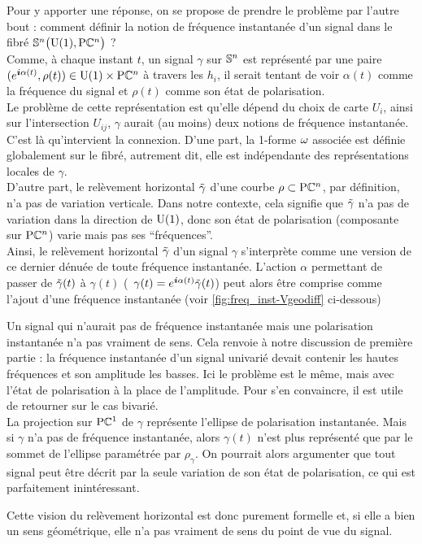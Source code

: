 Pour y apporter une réponse, on se propose de prendre le problème par l'autre bout : comment définir la notion de fréquence instantanée d'un signal dans le fibré $\VFP$ ?
\\

Comme, à chaque instant $t$, un signal $\gamma$ sur $\S{n}$ est représenté par une paire $(e^{\i \alpha(t)}, \rho(t))\in\U{1}\times\PC{n}$ à travers les $h_i$,  il serait tentant de voir $\alpha(t)$ comme la fréquence du signal et $\rho(t)$ comme son état de polarisation.
\\
Le problème de cette représentation est qu'elle dépend du choix de carte $U_i$, ainsi sur l'intersection $U_{ij}$, $\gamma$ aurait (au moins) deux notions de fréquence instantanée.
\\

C'est là qu'intervient la connexion. D'une part, la 1-forme $\conn$ associée est définie globalement sur le fibré, autrement dit, elle est indépendante des représentations locales de $\gamma$.
\\
D'autre part, le relèvement horizontal $\Tilde{\gamma}$ d'une courbe $\rho\subset\PC{n}$, par définition, n'a pas de variation verticale. Dans notre contexte, cela signifie que $\Tilde{\gamma}$ n'a pas de variation dans la direction de $\U{1}$, donc son état de polarisation (composante sur $\PC{n}$) varie mais pas ses ``fréquences''.
\\
Ainsi, le relèvement horizontal $\Tilde{\gamma}$ d'un signal $\gamma$ s'interprète comme une version de ce dernier dénuée de toute fréquence instantanée.
L'action $\alpha$ permettant de passer de $\Tilde{\gamma}(t)$ à $\gamma(t)$ (\ie~$\gamma(t) = e^{\i \alpha(t)} \Tilde{\gamma}(t)$) peut alors être comprise comme l'ajout d'une fréquence instantanée (voir \cref{fig:freq_inst-Vgeodiff} ci-dessous)	
\\

\begin{remarque}
Un signal qui n'aurait pas de fréquence instantanée mais une polarisation instantanée n'a pas vraiment de sens. 
Cela renvoie à notre discussion de première partie : la fréquence instantanée d'un signal univarié devait contenir les hautes fréquences et son amplitude les basses.
Ici le problème est le même, mais avec l'état de polarisation à la place de l’amplitude. Pour s'en convaincre, il est utile de retourner sur le cas bivarié.
\\
La projection sur $\PC{1}$ de $\gamma$ représente l'ellipse de polarisation instantanée. 
Mais si $\gamma$ n'a pas de fréquence instantanée, alors $\gamma(t)$ n'est plus représenté que par le sommet de l’ellipse paramétrée par $\rho_\gamma$. 
On pourrait alors argumenter que tout signal peut être décrit par la seule variation de son état de polarisation, ce qui est parfaitement inintéressant.

Cette vision du relèvement horizontal est donc purement formelle et, si elle a bien un sens géométrique, elle n'a pas vraiment de sens du point de vue du signal.
\end{remarque}
\skipl

